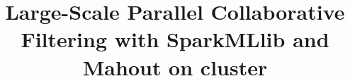 \documentclass[conference]{IEEEtran}
\begin{document}
\title{Large-Scale Parallel Collaborative Filtering with SparkMLlib and Mahout on cluster}
\end{document}
